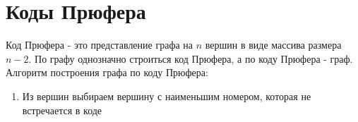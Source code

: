 \section{Коды Прюфера}
Код Прюфера - это представление графа на $n$ вершин в виде массива размера $n - 2$. По графу однозначно строиться код Прюфера, а по коду Прюфера - граф.\\
Алгоритм построения графа по коду Прюфера:\\
\begin{enumerate}
	\item Из вершин выбираем вершину с наименьшим номером, которая не встречается в коде
\end{enumerate}